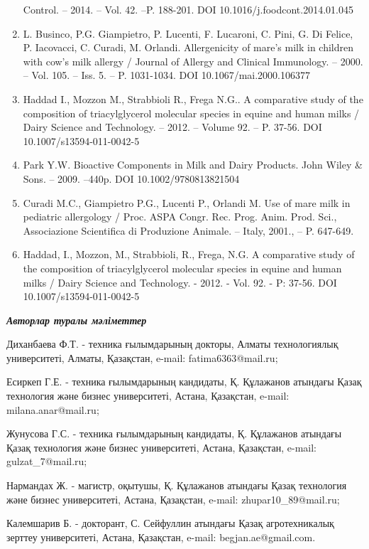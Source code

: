 \begin{enumerate}
  Control. -- 2014. -- Vol. 42. --P. 188-201. DOI
  10.1016/j.foodcont.2014.01.045
\item
  L. Businco, P.G. Giampietro, P. Lucenti, F. Lucaroni, C. Pini, G. Di
  Felice, P. Iacovacci, C. Curadi, M. Orlandi. Allergenicity of mare's
  milk in children with cow's milk allergy / Journal of Allergy and
  Clinical Immunology. -- 2000. -- Vol. 105. -- Iss. 5. -- P. 1031-1034.
  DOI 10.1067/mai.2000.106377
\item
  Haddad I., Mozzon M., Strabbioli R., Frega N.G.. A comparative study
  of the composition of triacylglycerol molecular species in equine and
  human milks / Dairy Science and Technology. -- 2012. -- Volume 92. --
  P. 37-56. DOI 10.1007/s13594-011-0042-5
\item
  Park Y.W. Bioactive Components in Milk and Dairy Products. John Wiley
  \& Sons. -- 2009. --440p. DOI 10.1002/9780813821504
\item
  Curadi M.C., Giampietro P.G., Lucenti P., Orlandi M. Use of mare milk
  in pediatric allergology / Proc. ASPA Congr. Rec. Prog. Anim. Prod.
  Sci., Associazione Scientifica di Produzione Animale. -- Italy, 2001.,
  -- P. 647-649.
\item
  Haddad, I., Mozzon, M., Strabbioli, R., Frega, N.G. A comparative
  study of the composition of triacylglycerol molecular species in
  equine and human milks / Dairy Science and Technology. - 2012. - Vol.
  92. - P: 37-56. DOI 10.1007/s13594-011-0042-5
\end{enumerate}

\emph{{\bfseries Авторлар туралы мәліметтер}}

Диханбаева Ф.Т. - техника ғылымдарының докторы, Алматы технологиялық
университеті, Алматы, Қазақстан, e-mail: fatima6363@mail.ru;

Есиркеп Г.Е. - техника ғылымдарының кандидаты, Қ. Құлажанов атындағы
Қазақ технология және бизнес университеті, Астана, Қазақстан, e-mail:
milana.anar@mail.ru;

Жунусова Г.С. - техника ғылымдарының кандидаты, Қ. Құлажанов атындағы
Қазақ технология және бизнес университеті, Астана, Қазақстан, e-mail:
gulzat\_7@mail.ru;

Нармандах Ж. - магистр, оқытушы, Қ. Құлажанов атындағы Қазақ технология
және бизнес университеті, Астана, Қазақстан, e-mail:
zhupar10\_89@mail.ru;

Калемшарив Б. - докторант, С. Сейфуллин атындағы Қазақ агротехникалық
зерттеу университеті, Астана, Қазақстан, e-mail: begjan.ae@gmail.com.

